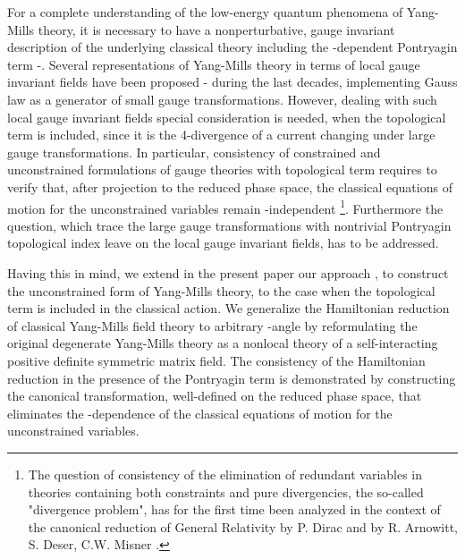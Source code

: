 \documentclass[a4paper,12pt]{article}
\begin{document}
For a complete understanding of the low-energy quantum phenomena
of Yang-Mills theory, it is necessary to have a nonperturbative,
gauge invariant description of the underlying classical theory
including the \myHighlight{$\theta$}\coordHE{}-dependent Pontryagin term \cite{JackiwRebbi}-\cite{Jackiw}.
Several representations of Yang-Mills theory in terms of local gauge
invariant fields
have been proposed \cite{GoldJack}-\cite{Majumdar} during the last decades,
implementing Gauss law as a generator of small gauge transformations.
However, dealing with such local gauge invariant fields
special consideration is needed, when the topological term is included,
since it is the 4-divergence of a current
changing under large gauge transformations. In particular,
consistency of constrained and unconstrained formulations of gauge
theories with topological term requires to verify that, after projection
to the reduced phase space, the classical equations of motion for
the unconstrained variables remain \myHighlight{$\theta$}\coordHE{}-independent
\footnote{
The question of consistency of the elimination of redundant variables
in theories containing both constraints and pure divergencies,
the so-called "divergence problem", has for the first time been analyzed
in the context of the canonical reduction of General Relativity
by P. Dirac \cite{Dirac} and by R. Arnowitt, S. Deser, C.W. Misner \cite{ADM}.
}.
Furthermore the question, which trace the large gauge transformations
with nontrivial Pontryagin topological index leave on the local gauge
invariant fields, has to be addressed.

Having this in mind, we extend in the present paper our approach
\cite{KP,AHG,KMPR}, to construct the unconstrained form of
\coordHE{} Yang-Mills theory, to the case when the topological term is included
in the classical action.
We generalize the Hamiltonian reduction of classical \coordHE{} Yang-Mills
field theory to arbitrary \myHighlight{$\theta$}\coordHE{}-angle
by reformulating the original degenerate
Yang-Mills theory as a nonlocal theory of a self-interacting
positive definite symmetric \coordHE{} matrix field.
The consistency of the Hamiltonian reduction in the presence of the
Pontryagin term is demonstrated by constructing
the canonical transformation, well-defined on the reduced phase space,
that eliminates the \myHighlight{$\theta$}\coordHE{}-dependence of the classical equations of motion
for the unconstrained variables.
\end{document}
